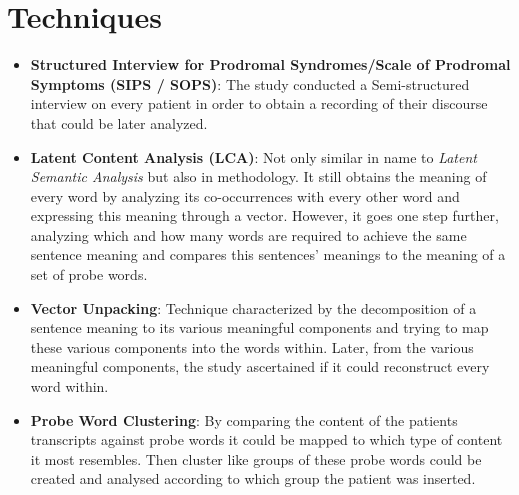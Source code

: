 \documentclass{Paper_Summary}
\begin{document}
\section{Techniques}
    \begin{itemize}
        \item \textbf{Structured Interview for Prodromal Syndromes/Scale of Prodromal Symptoms (SIPS / SOPS)}: The study conducted a Semi-structured interview on every patient in order to obtain a recording of their discourse that could be later analyzed.
        \item \textbf{Latent Content Analysis (LCA)}: Not only similar in name to \emph{Latent Semantic Analysis} but also in methodology. It still obtains the meaning of every word by analyzing its co-occurrences with every other word and expressing this meaning through a vector. However, it goes one step further, analyzing which and how many words are required to achieve the same sentence meaning and compares this sentences' meanings to the meaning of a set of probe words.
        \item \textbf{Vector Unpacking}: Technique characterized by the decomposition of a sentence meaning to its various meaningful components and trying to map these various components into the words within. Later, from the various meaningful components, the study ascertained if it could reconstruct every word within. 
        \item \textbf{Probe Word Clustering}: By comparing the content of the patients transcripts against probe words it could be mapped to which type of content it most resembles. Then cluster like groups of these probe words could be created and analysed according to which group the patient was inserted.
    \end{itemize}
\end{document}
